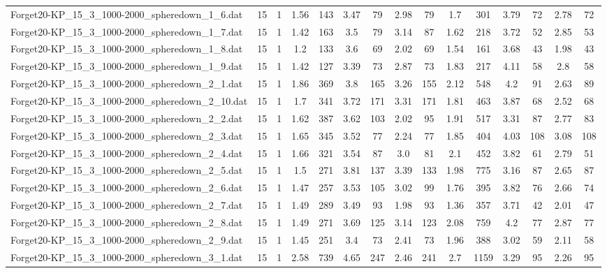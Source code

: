 \begin{table}[!ht]
{\begin{tabular}{lcccccccccccccc}
Forget20-KP\_15\_3\_1000-2000\_spheredown\_1\_6.dat & 15 & 1 & 1.56 & 143 & 3.47 & 79 & 2.98 & 79 & 1.7 & 301 & 3.79 & 72 & 2.78 & 72 \\
Forget20-KP\_15\_3\_1000-2000\_spheredown\_1\_7.dat & 15 & 1 & 1.42 & 163 & 3.5 & 79 & 3.14 & 87 & 1.62 & 218 & 3.72 & 52 & 2.85 & 53 \\
Forget20-KP\_15\_3\_1000-2000\_spheredown\_1\_8.dat & 15 & 1 & 1.2 & 133 & 3.6 & 69 & 2.02 & 69 & 1.54 & 161 & 3.68 & 43 & 1.98 & 43 \\
Forget20-KP\_15\_3\_1000-2000\_spheredown\_1\_9.dat & 15 & 1 & 1.42 & 127 & 3.39 & 73 & 2.87 & 73 & 1.83 & 217 & 4.11 & 58 & 2.8 & 58 \\
Forget20-KP\_15\_3\_1000-2000\_spheredown\_2\_1.dat & 15 & 1 & 1.86 & 369 & 3.8 & 165 & 3.26 & 155 & 2.12 & 548 & 4.2 & 91 & 2.63 & 89 \\
Forget20-KP\_15\_3\_1000-2000\_spheredown\_2\_10.dat & 15 & 1 & 1.7 & 341 & 3.72 & 171 & 3.31 & 171 & 1.81 & 463 & 3.87 & 68 & 2.52 & 68 \\
Forget20-KP\_15\_3\_1000-2000\_spheredown\_2\_2.dat & 15 & 1 & 1.62 & 387 & 3.62 & 103 & 2.02 & 95 & 1.91 & 517 & 3.31 & 87 & 2.77 & 83 \\
Forget20-KP\_15\_3\_1000-2000\_spheredown\_2\_3.dat & 15 & 1 & 1.65 & 345 & 3.52 & 77 & 2.24 & 77 & 1.85 & 404 & 4.03 & 108 & 3.08 & 108 \\
Forget20-KP\_15\_3\_1000-2000\_spheredown\_2\_4.dat & 15 & 1 & 1.66 & 321 & 3.54 & 87 & 3.0 & 81 & 2.1 & 452 & 3.82 & 61 & 2.79 & 51 \\
Forget20-KP\_15\_3\_1000-2000\_spheredown\_2\_5.dat & 15 & 1 & 1.5 & 271 & 3.81 & 137 & 3.39 & 133 & 1.98 & 775 & 3.16 & 87 & 2.65 & 87 \\
Forget20-KP\_15\_3\_1000-2000\_spheredown\_2\_6.dat & 15 & 1 & 1.47 & 257 & 3.53 & 105 & 3.02 & 99 & 1.76 & 395 & 3.82 & 76 & 2.66 & 74 \\
Forget20-KP\_15\_3\_1000-2000\_spheredown\_2\_7.dat & 15 & 1 & 1.49 & 289 & 3.49 & 93 & 1.98 & 93 & 1.36 & 357 & 3.71 & 42 & 2.01 & 47 \\
Forget20-KP\_15\_3\_1000-2000\_spheredown\_2\_8.dat & 15 & 1 & 1.49 & 271 & 3.69 & 125 & 3.14 & 123 & 2.08 & 759 & 4.2 & 77 & 2.87 & 77 \\
Forget20-KP\_15\_3\_1000-2000\_spheredown\_2\_9.dat & 15 & 1 & 1.45 & 251 & 3.4 & 73 & 2.41 & 73 & 1.96 & 388 & 3.02 & 59 & 2.11 & 58 \\
Forget20-KP\_15\_3\_1000-2000\_spheredown\_3\_1.dat & 15 & 1 & 2.58 & 739 & 4.65 & 247 & 2.46 & 241 & 2.7 & 1159 & 3.29 & 95 & 2.26 & 95 \\

\end{tabular}}
\end{table}
